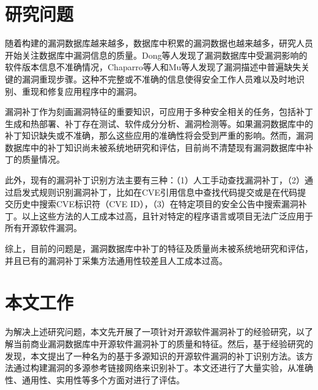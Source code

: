 \section{研究问题}
随着构建的漏洞数据库越来越多，数据库中积累的漏洞数据也越来越多，研究人员开始关注数据库中漏洞信息的质量。Dong等人\cite{dong2019towards}发现了漏洞数据库中受漏洞影响的软件版本信息不准确情况，Chaparro等人\cite{chaparro2017detecting}和Mu等人\cite{mu2018understanding}发现了漏洞描述中普遍缺失关键的漏洞重现步骤。这种不完整或不准确的信息使得安全工作人员难以及时地识别、重现和修复应用程序中的漏洞。

漏洞补丁作为刻画漏洞特征的重要知识，可应用于多种安全相关的任务，包括补丁生成和热部署\cite{mulliner2013patchdroid,duan2019automating,xu2020automatic}、补丁存在测试\cite{zhang2018precise,jiang2020pdiff,dai2020bscout}、软件成分分析\cite{ponta2020detection,pashchenko2020vuln4real,Wang2020empirical}、漏洞检测\cite{li2016vulpecker,li2018vuldeepecker,jang2012redebug,kim2017vuddy, xiao2020mvp, cui2020vuldetector}等。如果漏洞数据库中的补丁知识缺失或不准确，那么这些应用的准确性将会受到严重的影响。然而，漏洞数据库中的补丁知识尚未被系统地研究和评估，目前尚不清楚现有漏洞数据库中补丁的质量情况。

此外，现有的漏洞补丁识别方法主要有三种：（1）人工手动查找漏洞补丁\cite{xu2020automatic,jiang2020pdiff,dai2020bscout,zhou2017automated,sabetta2018practical,chen2020machine,xiao2020mvp,ponta2020detection,pashchenko2020vuln4real}，（2）通过启发式规则识别漏洞补丁，比如在CVE引用信息中查找代码提交\cite{duan2019automating,li2016vulpecker}或是在代码提交历史中搜索CVE标识符（CVE ID）\cite{you2017semfuzz,Wang2020empirical}，（3）在特定项目的安全公告中搜索漏洞补丁\cite{mulliner2013patchdroid,jang2012redebug,kim2017vuddy}。以上这些方法的人工成本过高，且针对特定的程序语言或项目无法广泛应用于所有开源软件漏洞。

综上，目前的问题是，漏洞数据库中补丁的特征及质量尚未被系统地研究和评估，并且已有的漏洞补丁采集方法通用性较差且人工成本过高。

\section{本文工作}
为解决上述研究问题，本文先开展了一项针对开源软件漏洞补丁的经验研究，以了解当前商业漏洞数据库中开源软件漏洞补丁的质量和特征。然后，基于经验研究的发现，本文提出了一种名为\tool 的基于多源知识的开源软件漏洞的补丁识别方法。该方法通过构建漏洞的多源参考链接网络来识别补丁。本文还进行了大量实验，从准确性、通用性、实用性等多个方面对\tool 进行了评估。

